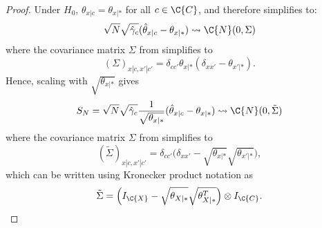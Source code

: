 \begin{proof}
  Under $H_0$, $\theta_{x|c} = \theta_{x|\ast}$ for all $c \in \C{C}$, and therefore  simplifies to:
  \begin{equation*}
    \sqrt{N} \sqrt{\hat\gamma_c} (\hat\theta_{x|c} - \theta_{x|\ast}) \leadsto \C{N}(0,\Sigma)
  \end{equation*}
  where the covariance matrix $\Sigma$ from  simplifies to
  \begin{equation*}
    (\Sigma)_{x|c,x'|c'} = \delta_{cc'} \theta_{x|\ast} (\delta_{xx'} - \theta_{x'|\ast}).
  \end{equation*}
  Hence, scaling with $\sqrt{\theta_{x|\ast}}$ gives
  \begin{equation*}
    S_N = \sqrt{N} \sqrt{\hat\gamma_c} \frac{1}{\sqrt{\theta_{x|\ast}}} (\hat\theta_{x|c} - \theta_{x|\ast}) \leadsto \C{N}(0,\tilde{\Sigma})
  \end{equation*}
  where the covariance matrix $\Sigma$ from  simplifies to
  \begin{equation*}
    (\tilde{\Sigma})_{x|c,x'|c'} = \delta_{cc'} \Big(\delta_{xx'} - \sqrt{\theta_{x|\ast}} \sqrt{\theta_{x'|\ast}}\Big),
  \end{equation*}
  which can be written using Kronecker product notation as
  $$\tilde\Sigma = \Big(I_{\C{X}} - \sqrt{\theta_{X|\ast}} \sqrt{\theta_{X|\ast}^T}\Big) \otimes I_{\C{C}}.$$

\end{proof}
